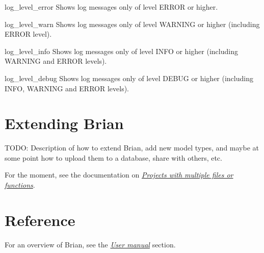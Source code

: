 \documentclass[letterpaper,10pt,english]{manual}
\begin{document}
\hypertarget{brian.log_level_error}{}\begin{funcdesc}{log\_level\_error}{}
Shows log messages only of level ERROR or higher.
\end{funcdesc}

\hypertarget{brian.log_level_warn}{}\begin{funcdesc}{log\_level\_warn}{}
Shows log messages only of level WARNING or higher (including ERROR level).
\end{funcdesc}

\hypertarget{brian.log_level_info}{}\begin{funcdesc}{log\_level\_info}{}
Shows log messages only of level INFO or higher (including WARNING and ERROR levels).
\end{funcdesc}

\hypertarget{brian.log_level_debug}{}\begin{funcdesc}{log\_level\_debug}{}
Shows log messages only of level DEBUG or higher (including INFO, WARNING and ERROR levels).
\end{funcdesc}

\resetcurrentobjects


\chapter{Extending Brian}

TODO: Description of how to extend Brian, add new model types, and maybe at
some point how to upload them to a database, share with others, etc.

For the moment, see the documentation on \hyperlink{projects-with-multiple-files}{\emph{Projects with multiple files or functions}}.

\resetcurrentobjects


\chapter{Reference}

For an overview of Brian, see the \hyperlink{user-manual}{\emph{User manual}} section.

\resetcurrentobjects
\end{document}
